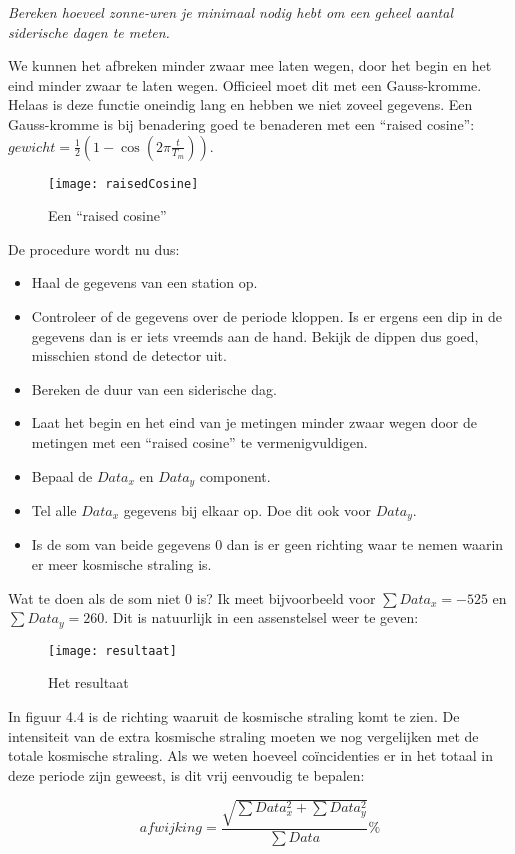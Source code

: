 \emph{Bereken hoeveel zonne-uren je minimaal nodig hebt om een geheel
aantal siderische dagen te meten.}

We kunnen het afbreken minder zwaar mee laten wegen, door het begin
en het eind minder zwaar te laten wegen. Officieel moet dit met een
Gauss-kromme. Helaas is deze functie oneindig lang en hebben we niet
zoveel gegevens. Een Gauss-kromme is bij benadering goed te benaderen
met een ``raised cosine'': $gewicht=\frac{1}{2}(1-\cos(2\pi\frac{t}{T_{m}}))$.

\begin{figure}[h]
\noindent \begin{centering}
\texttt{[image: raisedCosine]}
\par\end{centering}

\caption{Een ``raised cosine''}
\end{figure}


De procedure wordt nu dus:
\begin{itemize}
\item Haal de gegevens van een station op.
\item Controleer of de gegevens over de periode kloppen. Is er ergens een
dip in de gegevens dan is er iets vreemds aan de hand. Bekijk de dippen
dus goed, misschien stond de detector uit.
\item Bereken de duur van een siderische dag.
\item Laat het begin en het eind van je metingen minder zwaar wegen door
de metingen met een ``raised cosine'' te vermenigvuldigen.
\item Bepaal de $Data_{x}$ en $Data_{y}$ component.
\item Tel alle $Data_{x}$ gegevens bij elkaar op. Doe dit ook voor $Data_{y}$.
\item Is de som van beide gegevens 0 dan is er geen richting waar te nemen
waarin er meer kosmische straling is.
\end{itemize}
Wat te doen als de som niet 0 is? Ik meet bijvoorbeeld voor $\sum Data_{x}=-525$
en $\sum Data_{y}=260$. Dit is natuurlijk in een assenstelsel weer
te geven:

\begin{figure}[h]
\noindent \begin{centering}
\texttt{[image: resultaat]}
\par\end{centering}

\caption{Het resultaat}


\end{figure}


In figuur 4.4 is de richting waaruit de kosmische straling komt te
zien. De intensiteit van de extra kosmische straling moeten we nog
vergelijken met de totale kosmische straling. Als we weten hoeveel
coïncidenties er in het totaal in deze periode zijn geweest, is dit
vrij eenvoudig te bepalen:

\begin{equation}
afwijking=\frac{\sqrt{\sum Data_{x}^{2}+\sum Data_{y}^{2}}}{\sum Data}\%
\end{equation}


